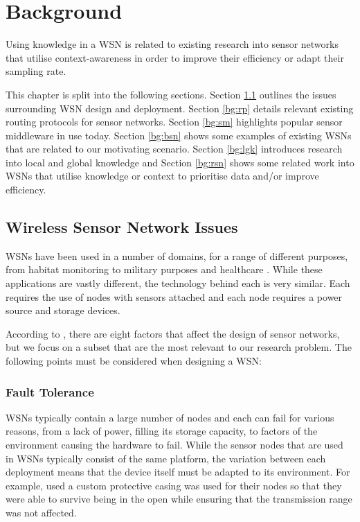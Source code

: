 \chapter{Background}\label{chap:bg}
Using knowledge in a WSN is related to existing research into sensor networks that utilise context-awareness in order to improve their efficiency or adapt their sampling rate. 

This chapter is split into the following sections. Section \ref{bg:wsni} outlines the issues surrounding WSN design and deployment. 
Section \ref{bg:rp} details relevant existing routing protocols for sensor networks. Section \ref{bg:sm} highlights popular sensor middleware in use today. Section \ref{bg:bsn} shows some examples of existing WSNs that are related to our motivating scenario. Section \ref{bg:lgk} introduces research into local and global knowledge and Section \ref{bg:rsn} shows some related work into WSNs that utilise knowledge or context to prioritise data and/or improve efficiency.

\section{Wireless Sensor Network Issues} \label{bg:wsni}

WSNs have been used in a number of domains, for a range of different purposes, from habitat monitoring \cite{Szewczyk2004a} to military purposes \cite{Pizzocaro} and healthcare \cite{Otto2006}. While these applications are vastly different, the technology behind each is very similar. Each requires the use of nodes with sensors attached and each node requires a power source and storage devices.

According to \cite{Akyildiz2002}, there are eight factors that affect the design of sensor networks, but we focus on a subset that are the most relevant to our research problem. The following points must be considered when designing a WSN:

\subsection{Fault Tolerance}
	WSNs typically contain a large number of nodes and each can fail for various reasons, from a lack of power, filling its storage capacity, to factors of the environment causing the hardware to fail. While the sensor nodes that are used in WSNs typically consist of the same platform, the variation between each deployment means that the device itself must be adapted to its environment. For example, \cite{Mainwaring2002} used a custom protective casing was used for their nodes so that they were able to survive being in the open while ensuring that the transmission range was not affected.

